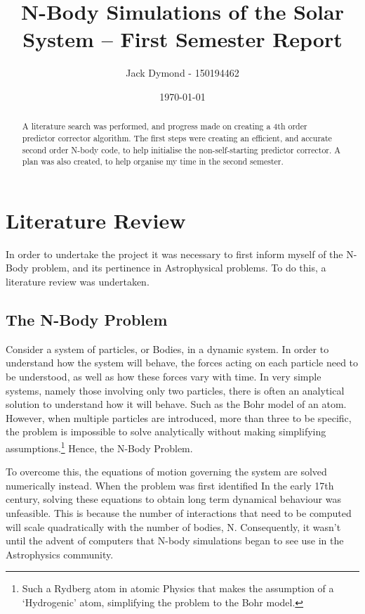 \documentclass[a4paper,10pt]{article}
\title{N-Body Simulations of the Solar System -- First Semester Report}
\author{Jack Dymond - 150194462}
\date{\today}
\begin{document}
\maketitle

\begin{abstract}
A literature search was performed, and progress made on creating a 4th order predictor corrector algorithm. The first steps were creating an efficient, and accurate second order N-body code, to help initialise the non-self-starting predictor corrector. A plan was also created, to help organise my time in the second semester. 
\end{abstract}

\section{Literature Review}

In order to undertake the project it was necessary to first inform myself of the N-Body problem, and its pertinence in Astrophysical problems. To do this, a literature review was undertaken.

\subsection{The N-Body Problem}

Consider a system of particles, or Bodies, in a dynamic system. In order to understand how the system will behave, the forces acting on each particle need to be understood, as well as how these forces vary with time. In very simple systems, namely those involving only two particles, there is often an analytical solution to understand how it will behave. Such as the Bohr model of an atom. However, when multiple particles are introduced, more than three to be specific, the problem is impossible to solve analytically without making simplifying assumptions.\footnote{Such a Rydberg atom in atomic Physics that makes the assumption of a `Hydrogenic' atom, simplifying the problem to the Bohr model.} Hence, the N-Body Problem.  

To overcome this, the equations of motion governing the system are solved numerically instead. When the problem was first identified In the early 17th century, solving these equations to obtain long term dynamical behaviour was unfeasible. This is because the number of interactions that need to be computed will scale quadratically with the number of bodies, N. Consequently, it wasn't until the advent of computers that N-body simulations began to see use in the Astrophysics community.
\end{document}

